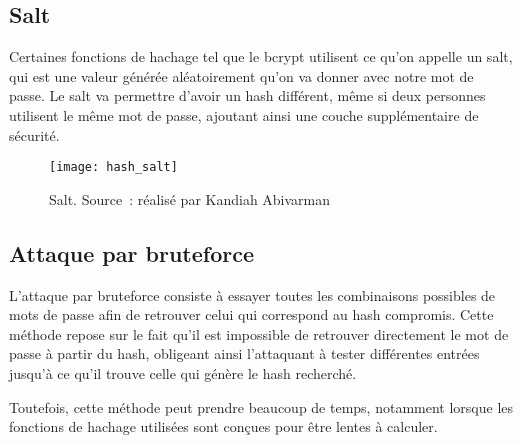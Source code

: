 \subsection{Salt}

Certaines fonctions de hachage tel que le bcrypt utilisent ce qu'on appelle un salt, qui est une valeur générée aléatoirement qu'on va donner avec notre mot de passe. Le salt va permettre d'avoir un hash différent, même si deux personnes utilisent le même mot de passe, ajoutant ainsi une couche supplémentaire de sécurité.

\begin{figure}[tbph!]
	\centering
	\texttt{[image: hash\_salt]}
	\caption[Salt]{Salt. Source : réalisé par Kandiah Abivarman}
	\label{fig:hash_salt}
\end{figure}

\newpage

\subsection{Attaque par bruteforce}

L'attaque par bruteforce consiste à essayer toutes les combinaisons possibles de mots de passe afin de retrouver celui qui correspond au hash compromis. Cette méthode repose sur le fait qu'il est impossible de retrouver directement le mot de passe à partir du hash, obligeant ainsi l'attaquant à tester différentes entrées jusqu'à ce qu'il trouve celle qui génère le hash recherché.

Toutefois, cette méthode peut prendre beaucoup de temps, notamment lorsque les fonctions de hachage utilisées sont conçues pour être lentes à calculer.